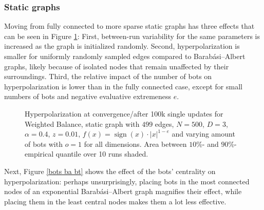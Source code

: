 \documentclass[11pt]{article}
\DeclareMathOperator{\sign}{sign}
\begin{document}
\subsubsection{Static graphs}
Moving from fully connected to more sparse static graphs has three effects that can be seen in  Figure \ref{bots sparse}: First, between-run variability for the same parameters is increased as the graph is initialized randomly. Second, hyperpolarization is smaller for uniformly randomly sampled edges compared to Barabási–Albert graphs, likely because of isolated nodes that remain unaffected by their surroundings. Third, the relative impact of the number of bots on hyperpolarization is lower than in the fully connected case, except for small numbers of bots and negative evaluative extremeness $e$. \begin{figure}[!h]


\caption{Hyperpolarization at convergence/after 100k single updates for Weighted Balance, static graph with $499$ edges, $N=500$, $D=3$, $\alpha=0.4$, $z=0.01$, $f(x)=\sign(x)\cdot|x|^{1-e}$ and varying amount of bots with $o=1$ for all dimensions. Area between $10\%$- and $90\%$- empirical quantile over 10 runs shaded.}
\label{bots sparse}
\end{figure}
Next, Figure \ref{bots ba bt} shows the effect of the bots' centrality on hyperpolarization: perhaps unsurprisingly, placing bots in the most connected nodes of an exponential Barabási–Albert graph magnifies their effect, while placing them in the least central nodes makes them a lot less effective. 
\end{document}
